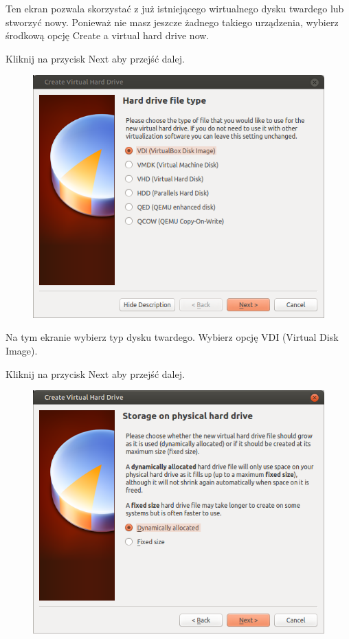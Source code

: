Ten ekran pozwala skorzystać z już istniejącego wirtualnego dysku twardego lub stworzyć nowy. Ponieważ nie masz jeszcze żadnego takiego urządzenia, wybierz środkową opcję \textcolor{ubuntu_orange}{Create a virtual hard drive now}.
\begin{flushright}
Kliknij na przycisk \textcolor{ubuntu_orange}{Next} aby przejść dalej.
\end{flushright}
\clearpage
\begin{figure}
                \includegraphics[width=\linewidth]{images/virtualbox_wizard4.png}
\end{figure}

Na tym ekranie wybierz typ dysku twardego. Wybierz opcję \textcolor{ubuntu_orange}{VDI (Virtual Disk Image)}.
\begin{flushright}
Kliknij na przycisk \textcolor{ubuntu_orange}{Next} aby przejść dalej.
\end{flushright}
\clearpage
\begin{figure}
	\includegraphics[width=\linewidth]{images/virtualbox_wizard5.png}
\end{figure}

